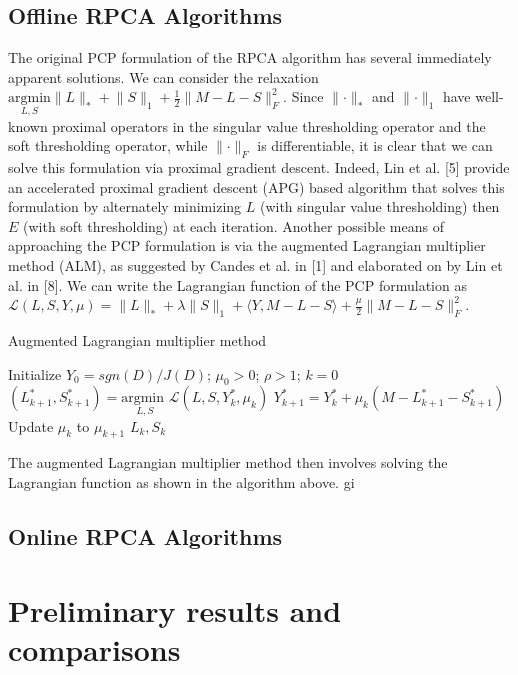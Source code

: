 \documentclass[oneside]{article}
\begin{document}
\subsection{Offline RPCA Algorithms}
The original PCP formulation of the RPCA algorithm  has several immediately apparent solutions. We can consider the relaxation $\underset{L,S}{\text{argmin}} \lVert L\rVert_{*} + \lVert S\rVert_{1} + \frac{1}{2}\lVert M-L-S\rVert^{2}_{F}$. Since $\lVert\cdot\rVert_{*}$ and $\lVert\cdot\rVert_{1}$ have well-known proximal operators in the singular value thresholding operator and the soft thresholding operator, while $\lVert\cdot\rVert_{F}$ is differentiable, it is clear that we can solve this formulation via proximal gradient descent. Indeed, Lin et al. [5] provide an accelerated proximal gradient descent (APG) based algorithm that solves this formulation by alternately minimizing $L$ (with singular value thresholding) then $E$ (with soft thresholding) at each iteration.\newline\newline
Another possible means of approaching the PCP formulation is via the augmented Lagrangian multiplier method (ALM), as suggested by Candes et al. in [1] and elaborated on by Lin et al. in [8]. We can write the Lagrangian function of the PCP formulation as $\mathcal{L}(L,S, Y, \mu) = \lVert L\rVert_{*} + \lambda\lVert S\rVert_{1} + \langle Y, M-L-S\rangle +\frac{\mu}{2}\lVert M-L-S\rVert_{F}^{2}$.
\begin{algorithm}
 \caption{Augmented Lagrangian multiplier method}
 \begin{algorithmic}  
 \STATE Initialize $Y_{0} = sgn(D)/J(D)$; $\mu_{0} >0$; $\rho > 1$; $k = 0$
\STATE $(L_{k+1}^{*}, S_{k+1}^{*}) = \underset{L,S}{\text{argmin   }}\mathcal{L}(L,S,Y_{k}^{*},\mu_{k})$
\STATE $Y_{k+1}^{*} = Y_{k}^{*} + \mu_{k}(M-L_{k+1}^{*}-S_{k+1}^{*})$
\STATE Update $\mu_{k}$ to $\mu_{k+1}$
\ENDWHILE
\RETURN $L_{k}, S_{k}$
 \end{algorithmic}
 \end{algorithm}
The augmented Lagrangian multiplier method then involves solving the Lagrangian function as shown in the algorithm above. gi
\subsection{Online RPCA Algorithms}


\section{Preliminary results and comparisons}
\end{document}
